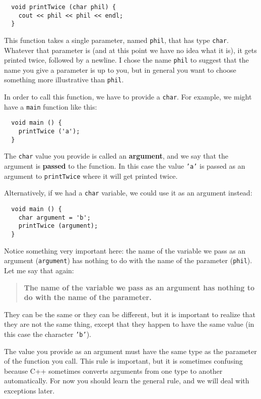 \begin{verbatim}
  void printTwice (char phil) {
    cout << phil << phil << endl;
  }
\end{verbatim}
%
This function takes a single parameter, named {\tt phil}, that
has type {\tt char}.  Whatever that parameter is (and at
this point we have no idea what it is), it gets printed
twice, followed by a newline.
I chose the name {\tt phil} to suggest that the name
you give a parameter is up to you, but in general you want to
choose something more illustrative than {\tt phil}.

In order to call this function, we have to provide a {\tt char}.
For example, we might have a {\tt main} function like this:

\begin{verbatim}
  void main () {
    printTwice ('a');
  }
\end{verbatim}
%
The {\tt char} value you provide is called an {\bf argument}, and we
say that the argument is {\bf passed} to the function.  In this
case the value {\tt 'a'} is passed as an argument
to {\tt printTwice} where it will get printed twice.

Alternatively, if we had a {\tt char} variable, we could
use it as an argument instead:

\begin{verbatim}
  void main () {
    char argument = 'b';
    printTwice (argument);
  }
\end{verbatim}
%
Notice something very important here: the name of the variable we pass
as an argument ({\tt argument}) has nothing to do with the name of the
parameter ({\tt phil}).  Let me say that again:

\begin{quote}

{\bf The name of the variable we pass as an argument has nothing to do
with the name of the parameter.}

\end{quote}

They can be the same or they can be different, but it is important
to realize that they are not the same thing, except that they happen
to have the same value (in this case the character {\tt 'b'}).

The value you provide as an argument must have the same type as
the parameter of the function you call.  This rule is
important, but it is sometimes confusing because C++ sometimes
converts arguments from one type to another automatically.  For
now you should learn the general rule, and we will deal with
exceptions later.

